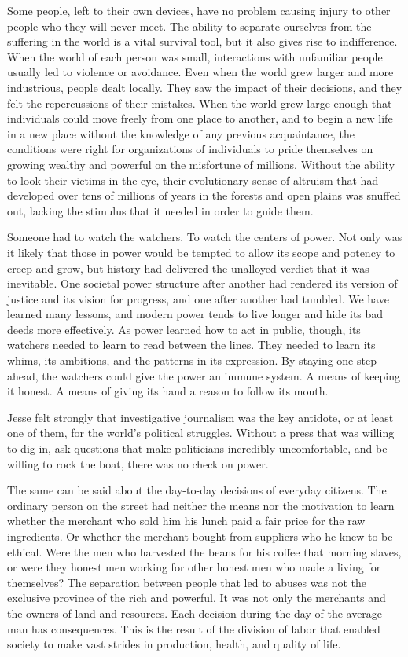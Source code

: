\documentclass[12pt]{book}
\begin{document}
Some people, left to their own devices, have no problem causing injury to other people who they will never meet.  The ability to separate ourselves from the suffering in the world is a vital survival tool, but it also gives rise to indifference.  When the world of each person was small, interactions with unfamiliar people usually led to violence or avoidance.  Even when the world grew larger and more industrious, people dealt locally.  They saw the impact of their decisions, and they felt the repercussions of their mistakes.  When the world grew large enough that individuals could move freely from one place to another, and to begin a new life in a new place without the knowledge of any previous acquaintance, the conditions were right for organizations of individuals to pride themselves on growing wealthy and powerful on the misfortune of millions.  Without the ability to look their victims in the eye, their evolutionary sense of altruism that had developed over tens of millions of years in the forests and open plains was snuffed out, lacking the stimulus that it needed in order to guide them.

Someone had to watch the watchers.  To watch the centers of power.  Not only was it likely that those in power would be tempted to allow its scope and potency to creep and grow, but history had delivered the unalloyed verdict that it was inevitable.  One societal power structure after another had rendered its version of justice and its vision for progress, and one after another had tumbled.  We have learned many lessons, and modern power tends to live longer and hide its bad deeds more effectively.  As power learned how to act in public, though, its watchers needed to learn to read between the lines.  They needed to learn its whims, its ambitions, and the patterns in its expression.  By staying one step ahead, the watchers could give the power an immune system.  A means of keeping it honest.  A means of giving its hand a reason to follow its mouth.

Jesse felt strongly that investigative journalism was the key antidote, or at least one of them, for the world's political struggles.  Without a press that was willing to dig in, ask questions that make politicians incredibly uncomfortable, and be willing to rock the boat, there was no check on power.  

The same can be said about the day-to-day decisions of everyday citizens.  The ordinary person on the street had neither the means nor the motivation to learn whether the merchant who sold him his lunch paid a fair price for the raw ingredients.  Or whether the merchant bought from suppliers who he knew to be ethical.  Were the men who harvested the beans for his coffee that morning slaves, or were they honest men working for other honest men who made a living for themselves?  The separation between people that led to abuses was not the exclusive province of the rich and powerful.  It was not only the merchants and the owners of land and resources.  Each decision during the day of the average man has consequences.  This is the result of the division of labor that enabled society to make vast strides in production, health, and quality of life.
\end{document}
